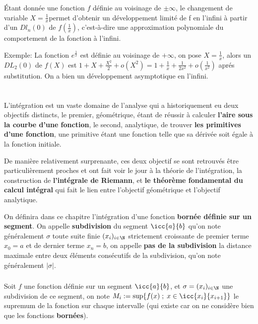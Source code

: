 \subsection*{}
Étant donnée une fonction \(f\) définie au voisinage de \(\pm \infty\), le changement de variable
\( X = \frac{1}{x}\)permet d'obtenir un développement limité de f en l'infini à partir d'un
\(Dl_n(0)\) de \(f(\frac{1}{x})\), c'est-à-dire une approximation polynomiale du comportement de la fonction à l'infini.\<

Exemple: La fonction \(e^\frac{1}{x}\) est définie au voisinage de \(+ \infty\), on pose \(X = \frac{1}{x}\), alors un \(DL_2(0)\) de \(f(X)\) est \(1 + X + \frac{X^2}{2}+o(X^2) = 1 + \frac{1}{x} + \frac{1}{2x^2} + o(\frac{1}{x^2})\) aprés substitution. On a bien un développement asymptotique en l'infini.

\chapter*{}
L'intégration est un vaste domaine de l'analyse qui a historiquement eu deux objectifs distincts, le premier, géométrique, étant de réussir à calculer \textbf{l'aire sous la courbe d'une fonction}, le second, analytique, de trouver \textbf{les primitives d'une fonction}, une primitive étant une fonction telle que sa dérivée soit égale à la fonction initiale.\<

De manière relativement surprenante, ces deux objectif se sont retrouvés être particulièrement proches et ont fait voir le jour à la théorie de l'intégration, la construction de \textbf{l'intégrale de Riemann}, et \textbf{le théorème fondamental du calcul intégral} qui fait le lien entre l'objectif géométrique et l'objectif analytique.\<

On définira dans ce chapitre l'intégration d'une fonction \textbf{bornée définie sur un segment}.\+
On appelle \textbf{subdivision} du segment \(\icc{a}{b}\) qu'on note généralement \(\sigma\) toute suite finie \((x_i)_{i \in \N}\) strictement croissante de premier terme \(x_0 = a\) et de dernier terme \(x_n = b\), on appelle \textbf{pas de la subdivision} la distance maximale entre deux éléments consécutifs de la subdivision, qu'on note généralement \(|\sigma|\).

\subsection*{}
Soit \(f\) une fonction définie sur un segment \(\icc{a}{b}\), et \(\sigma = (x_i)_{i \in \N}\) une subdivision de ce segment, on note \(M_i := \sup\{f(x) \; ; \; x \in \icc{x_i}{x_{i+1}}\}\) le supremum de la fonction sur chaque intervalle (qui existe car on ne considère bien que les fonctions \textbf{bornées}).\<

